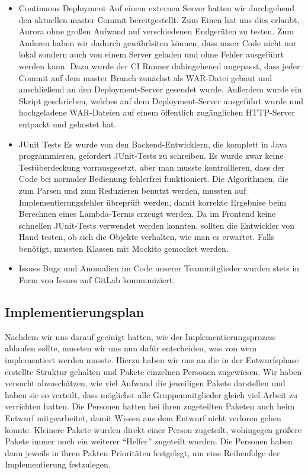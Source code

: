 \documentclass[parskip=full,11pt,twoside]{scrartcl}
\begin{document}
\begin{itemize}
    \item Continuous Deployment
        \newline
        Auf einem externen Server hatten wir durchgehend den aktuellen master Commit bereitgestellt.
        Zum Einen hat uns dies erlaubt, Aurora ohne großen Aufwand auf verschiedenen Endgeräten zu testen.
        Zum Anderen haben wir dadurch gewährlsiten können, dass unser Code nicht nur lokal sondern auch von einem Server geladen und ohne Fehler ausgeführt werden kann.
		Dazu wurde der CI Runner dahingehened angepasst, dass jeder Commit auf dem master Branch zunächst als WAR-Datei
		gebaut und anschließend an den Deployment-Server gesendet wurde.
		Außerdem wurde ein Skript geschrieben, welches auf dem Deployment-Server ausgeführt wurde und hochgeladene
		WAR-Dateien auf einem öffentlich zugänglichen HTTP-Server entpackt und gehostet hat.

       \item JUnit Tests
       \newline
      	Es wurde von den Backend-Entwicklern, die komplett in Java programmieren, gefordert JUnit-Tests zu schreiben.
      	Es wurde zwar keine Testüberdeckung vorrausgesetzt, aber man musste kontrollieren, dass der Code bei normaler Bedienung fehlerfrei funktioniert.
      	Die Algorithmen, die zum Parsen und zum Reduzieren benutzt werden, mussten auf Implementierungsfehler übreprüft werden, damit korrekte Ergebnise beim Berechnen eines Lambda-Terms erzeugt werden.
      	Da im Frontend keine schnellen JUnit-Tests verwendet werden konnten, sollten die Entwickler von Hand testen, ob sich die Objekte verhalten, wie man es erwartet.
      	Falls benötigt, mussten Klassen mit Mockito gemocket werden.
      	\item Issues
        \newline
      	Bugs und Anomalien im Code unserer Teammitglieder wurden stets in Form von Issues auf GitLab kommuniziert.
      	\end{itemize}

\subsection{Implementierungsplan}
Nachdem wir uns darauf geeinigt hatten, wie der Implementierungsprozess ablaufen sollte, mussten wir uns nun dafür entscheiden, was von wem implementiert werden musste.
Hierzu haben wir uns an die in der Entwurfsphase erstellte Struktur gehalten und Pakete einzelnen Personen zugewiesen.
Wir haben versucht abzuschätzen, wie viel Aufwand die jeweiligen Pakete darstellen und haben sie so verteilt, dass möglichst alle Gruppenmitglieder gleich viel Arbeit zu verrichten hatten.
Die Personen hatten bei ihren zugeteilten Paketen auch beim Entwurf mitgearbeitet, damit Wissen aus dem Entwurf nicht verloren gehen konnte.
Kleinere Pakete wurden direkt einer Person zugeteilt, wohingegen größere Pakete immer noch ein weiterer \enquote{Helfer} zugeteilt wurden.
Die Personen haben dann jeweils in ihren Pakten Prioritäten festgelegt, um eine Reihenfolge der Implementierung festzulegen.
\end{document}
